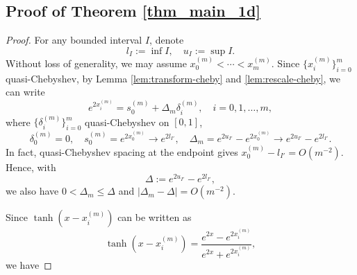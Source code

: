 \documentclass{article}
\numberwithin{equation}{section}
\begin{document}
\subsection{Proof of Theorem \ref{thm_main_1d}}
\begin{proof}
    For any bounded interval $I$, denote $$l_I:=\inf I,\quad u_I:=\sup I.$$ 
    Without loss of generality, we may assume $x_0^{(m)}<\cdots<x_m^{(m)}$. 
    Since $\{x_i^{(m)}\}_{i=0}^m$ quasi-Chebyshev, by Lemma \ref{lem:transform-cheby} and \ref{lem:rescale-cheby}, we can write 
    $$e^{2x_i^{(m)}} = s_0^{(m)} + \Delta_m\delta_i^{(m)},\quad i=0,1,\ldots,m,$$ 
    where $\{\delta_i^{(m)}\}_{i=0}^m$ quasi-Chebyshev on $[0,1]$, $$\delta_0^{(m)}=0,\quad s_0^{(m)}=e^{2x_0^{(m)}}\to e^{2l_{I'}}, \quad\Delta_m = e^{2u_{I'}}-e^{2x_0^{(m)}}\to e^{2u_{I'}}-e^{2l_{I'}}.$$ 
    In fact, quasi-Chebyshev spacing at the endpoint gives $x_0^{(m)}-l_{I'}=O(m^{-2})$. Hence, with
    $$
        \Delta:=e^{2u_{I'}}-e^{2l_{I'}},
    $$
    we also have $0<\Delta_m\leq\Delta$ and $|\Delta_m-\Delta|=O(m^{-2})$.
    
    Since $\tanh(x-x_i^{(m)})$ can be written as
    $$\tanh(x-x_i^{(m)}) = \frac{e^{2x}-e^{2x_i^{(m)}}}{e^{2x}+e^{2x_i^{(m)}}}, $$
    we have


\end{proof}
\end{document}
